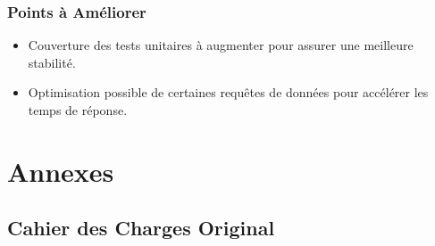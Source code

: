 \documentclass[11pt]{article}
\begin{document}
\subsubsection{Points à Améliorer}
\begin{itemize}
    \item Couverture des tests unitaires à augmenter pour assurer une meilleure stabilité.
    \item Optimisation possible de certaines requêtes de données pour accélérer les temps de réponse.
\end{itemize}


\section{Annexes}

\subsection{Cahier des Charges Original}
\end{document}

